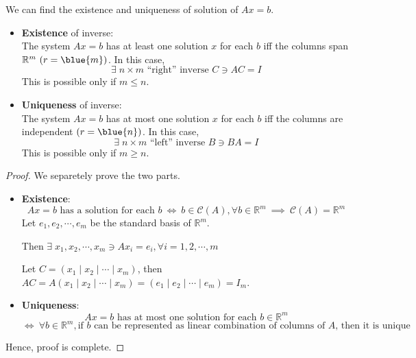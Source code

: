 \begin{proposition}[2Q]
    We can find the existence and uniqueness of solution of $Ax=b$.
    \begin{itemize}
        \item \textbf{Existence} of inverse: \\
        The system $Ax=b$ has at least one solution $x$ for each $b$ iff the columns span $\mathbb{R}^m\ (r = \blue{m})$. In this case, $$\exists\; n \times m \text{ ``right'' inverse } C \ni AC = I$$ This is possible only if $m \leq n$.
        \item \textbf{Uniqueness} of inverse: \\
        The system $Ax=b$ has at most one solution $x$ for each $b$ iff the columns are independent $(r = \blue{n})$. In this case, $$\exists\; n \times m \text{ ``left'' inverse } B \ni BA = I$$ This is possible only if $m \geq n$.
    \end{itemize}
\end{proposition}
\begin{proof}
    We separetely prove the two parts.
    \begin{itemize}
        \item \textbf{Existence}: 
        \[
            Ax = b \text{ has a solution for each } b \ \iff \ b \in \mathcal{C}(A), \forall b \in \mathbb{R}^m \ \implies \ \mathcal{C}(A) = \mathbb{R}^m
        \]
        Let $e_1, e_2, \cdots, e_m$ be the standard basis of $\mathbb{R}^m$.

        \vspace{0.5em}

        Then $\exists\; x_1, x_2, \cdots, x_m \ni Ax_i = e_i, \forall i = 1, 2, \cdots, m$

        \vspace{0.5em}

        Let $C = (x_1 \mid x_2 \mid \cdots \mid x_m)$, then $AC = A(x_1 \mid x_2 \mid \cdots \mid x_m) = (e_1 \mid e_2 \mid \cdots \mid e_m) = I_m$.
        \item \textbf{Uniqueness}: 
        \[
            Ax = b \text{ has at most one solution for each } b \in \mathbb{R}^m
        \]
        \[
            \iff \ \forall b \in \mathbb{R}^m, \text{if $b$ can be represented as linear combination of columns of $A$, then it is unique}
        \]
    \end{itemize}
    Hence, proof is complete.
\end{proof}

